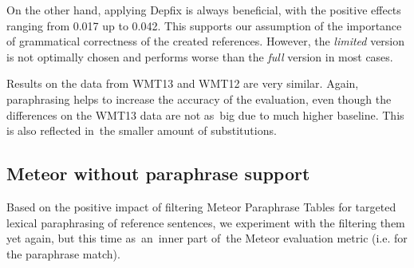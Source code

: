 \documentclass[11pt]{article}
\begin{document}
On the other hand, applying Depfix is always beneficial, with the positive 
effects ranging from 0.017 up to 0.042. This supports our assumption of the 
importance of grammatical correctness of the created references. However, the 
\textit{limited} version is not optimally chosen and performs worse than the 
\textit{full} version in most cases.

Results on the data from WMT13 and WMT12 are very similar. Again, paraphrasing 
helps to increase the accuracy of the evaluation, even though the differences 
on the WMT13 data are not as~big due to much higher baseline. This is also 
reflected in~the smaller amount of substitutions.

\subsection{Meteor without paraphrase support}
\label{parmesan}
Based on the positive impact of filtering Meteor Paraphrase Tables for targeted
lexical paraphrasing of reference sentences, we experiment with the filtering 
them yet again, but this time as~an~inner part of~the Meteor evaluation metric 
(i.e. for the paraphrase match).

\begin{table}[tb]
\begin{center}

\caption{Different paraphrase tables for Meteor and their size (number of paraphrase pairs).}
\label{meteory}
\end{center}
\end{table}
\end{document}
